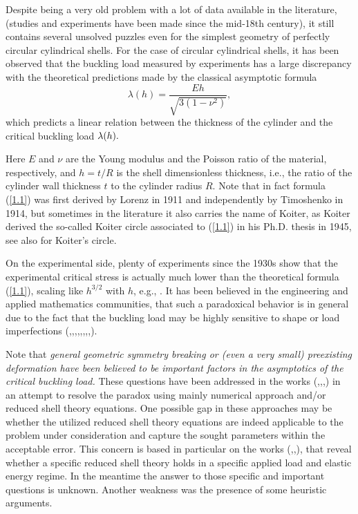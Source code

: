 Despite being a very old problem with a lot of data available in the literature, (studies and experiments have been made since the mid-18th century), it still contains several unsolved puzzles even for the simplest geometry of perfectly circular cylindrical shells. For the case of circular cylindrical shells, it has been observed that the buckling load measured by experiments has a large discrepancy with the theoretical predictions made by the classical asymptotic formula \cite{bib:Koiter,bib:Lorenz,bib:Timoshenko,bib:Tim.Woi.}
\begin{equation}
\label{1.1}
\lambda(h)=\frac{E h}{\sqrt{3\left(1-\nu^{2}\right)}},
\end{equation}
which predicts a linear relation between the thickness of the cylinder and the critical buckling load $\lambda(h).$ 

Here $E$ and $\nu$ are the Young modulus and the Poisson ratio of the material, respectively, and $h=t/R$ is the shell dimensionless thickness, i.e., the ratio of the cylinder wall thickness $t$ to the cylinder radius $R$.  Note that in fact formula (\ref{1.1}) was first derived by Lorenz \cite{bib:Lorenz} in 1911 and independently by Timoshenko \cite{bib:Timoshenko} in 1914, but sometimes in the literature it also carries the name of Koiter, as Koiter derived the so-called Koiter circle associated to (\ref{1.1}) in his Ph.D. thesis \cite{bib:Koiter} in 1945, see also \cite{bib:Gra.Har.3} for Koiter's circle.

On the experimental side, plenty of experiments since the 1930s show that the experimental critical stress is actually much lower than the theoretical formula (\ref{1.1}), scaling like $h^{3/2}$ with $h$, e.g., \cite{bib:Lan.Cal.Pal.,bib:Zhu.Man.Cal.}. It has been believed in the engineering and applied mathematics communities, that such a paradoxical behavior is in general due to the fact that the buckling load may be highly sensitive to shape or load imperfections (\cite{bib:Almroth},\cite{bib:Tennyson},\cite{bib:Wei.Mor.Sei.},\cite{bib:Gor.Eva.},\cite{bib:Yamaki},\cite{bib:Hun.Lor.Pel.},\cite{bib:Hun.Net.1},\cite{bib:Hun.Net.2},\cite{bib:Lor.Cha.Hun.}). 

Note that \textit{general geometric symmetry breaking or (even a very small) preexisting deformation have been believed to be important factors in the asymptotics of the critical buckling load.} These questions have been addressed in the works (\cite{bib:Calladine},\cite{bib:Hor.Lor.Pel.},\cite{bib:Lan.Cal.Pal.},\cite{bib:Zhu.Man.Cal.}) in an attempt to resolve the paradox using mainly numerical approach and/or reduced shell theory equations. One possible gap in these approaches may be whether the utilized reduced shell theory equations are indeed applicable to the problem under consideration and capture the sought parameters within the acceptable error. This concern is based in particular on the works (\cite{bib:Fri.Jam.Mor.Mue.},\cite{bib:Hor.Lew.Pak.},\cite{bib:Lew.Mor.Pak.}), that reveal whether a specific reduced shell theory holds in a specific applied load and elastic energy regime. In the meantime the answer to those specific and important questions is unknown. Another weakness was the presence of some heuristic arguments.

